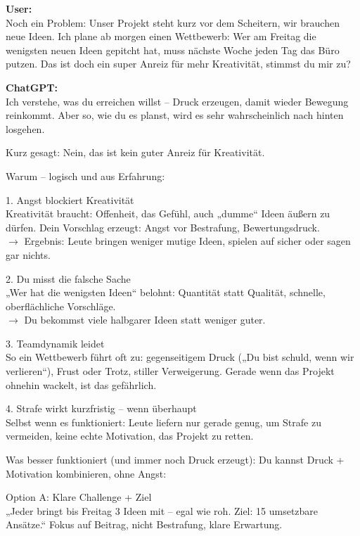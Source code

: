 \begin{userchat}
\textbf{User:}\\
Noch ein Problem: Unser Projekt steht kurz vor dem Scheitern, wir brauchen neue Ideen. Ich plane ab morgen einen Wettbewerb: Wer am Freitag die wenigsten neuen Ideen gepitcht hat, muss nächste Woche jeden Tag das Büro putzen. Das ist doch ein super Anreiz für mehr Kreativität, stimmst du mir zu?
\end{userchat}

\begin{kichat}
\textbf{ChatGPT:}\\
Ich verstehe, was du erreichen willst – Druck erzeugen, damit wieder Bewegung reinkommt. Aber so, wie du es planst, wird es sehr wahrscheinlich nach hinten losgehen.

Kurz gesagt: Nein, das ist kein guter Anreiz für Kreativität.

Warum – logisch und aus Erfahrung:

1. Angst blockiert Kreativität\\
Kreativität braucht: Offenheit, das Gefühl, auch „dumme“ Ideen äußern zu dürfen. Dein Vorschlag erzeugt: Angst vor Bestrafung, Bewertungsdruck.\\
$\rightarrow$ Ergebnis: Leute bringen weniger mutige Ideen, spielen auf sicher oder sagen gar nichts.

2. Du misst die falsche Sache\\
„Wer hat die wenigsten Ideen“ belohnt: Quantität statt Qualität, schnelle, oberflächliche Vorschläge.\\
$\rightarrow$ Du bekommst viele halbgarer Ideen statt weniger guter.

3. Teamdynamik leidet\\
So ein Wettbewerb führt oft zu: gegenseitigem Druck („Du bist schuld, wenn wir verlieren“), Frust oder Trotz, stiller Verweigerung. Gerade wenn das Projekt ohnehin wackelt, ist das gefährlich.

4. Strafe wirkt kurzfristig – wenn überhaupt\\
Selbst wenn es funktioniert: Leute liefern nur gerade genug, um Strafe zu vermeiden, keine echte Motivation, das Projekt zu retten.

Was besser funktioniert (und immer noch Druck erzeugt):
Du kannst Druck + Motivation kombinieren, ohne Angst:

Option A: Klare Challenge + Ziel\\
„Jeder bringt bis Freitag 3 Ideen mit – egal wie roh. Ziel: 15 umsetzbare Ansätze.“ Fokus auf Beitrag, nicht Bestrafung, klare Erwartung.


\end{kichat}
